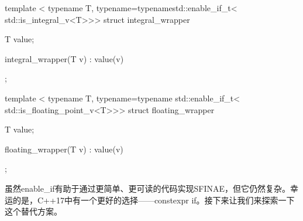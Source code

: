\begin{cpp}
template <
	typename T,
	typename=typenamestd::enable_if_t<
						 std::is_integral_v<T>>>
struct integral_wrapper
{
	T value;
	
	integral_wrapper(T v) : value(v) {}
};

template <
	typename T,
	typename=typename std::enable_if_t<
						 std::is_floating_point_v<T>>>
struct floating_wrapper
{
	T value;
	
	floating_wrapper(T v) : value(v) {}
};
\end{cpp}

虽然enable\_if有助于通过更简单、更可读的代码实现SFINAE，但它仍然复杂。幸运的是，C++17中有一个更好的选择——constexpr if。接下来让我们来探索一下这个替代方案。


































